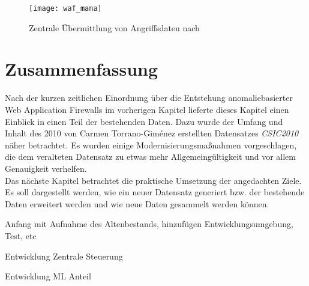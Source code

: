 \begin{figure}[ht]
  \begin{center}
    \texttt{[image: waf\_mana]}
    \caption{Zentrale Übermittlung von Angriffsdaten nach~\cite{Manaseer2018}}
    \label{fig.wafmana}
  \end{center}
\end{figure}



\section{Zusammenfassung}

Nach der kurzen zeitlichen Einordnung über die Entstehung anomaliebasierter Web Application Firewalls im vorherigen Kapitel lieferte dieses Kapitel einen Einblick in einen Teil der bestehenden Daten. Dazu wurde der Umfang und Inhalt des 2010 von Carmen Torrano-Giménez erstellten Datensatzes \emph{CSIC2010} näher betrachtet. Es wurden einige Modernisierungsmaßnahmen vorgeschlagen, die dem veralteten Datensatz zu etwas mehr Allgemeingültigkeit und vor allem Genauigkeit verhelfen.\\

Das nächste Kapitel betrachtet die praktische Umsetzung der angedachten Ziele. Es soll dargestellt werden, wie ein neuer Datensatz generiert bzw. der bestehende Daten erweitert werden und wie neue Daten gesammelt werden können. 

\begin{neu}
  Anfang mit Aufnahme des Altenbestands, hinzufügen Entwicklungsumgebung, Test, etc

  Entwicklung Zentrale Steuerung

  Entwicklung ML Anteil
\end{neu}